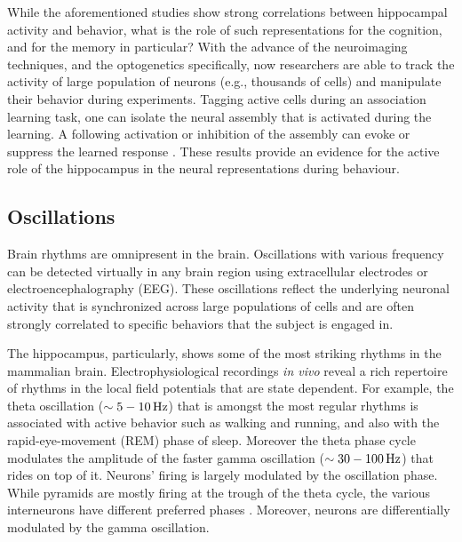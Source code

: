    While the aforementioned studies show strong correlations between
    hippocampal activity and behavior, what is the role of such representations
    for the cognition, and for the memory in particular? With the advance of
    the neuroimaging techniques, and the optogenetics specifically, now
    researchers are able to track the activity of large population of neurons
    (e.g., thousands of cells) and manipulate their behavior during
    experiments. Tagging active cells during an association learning task, one
    can isolate the neural assembly that is activated during the learning. A
    following activation or inhibition of the assembly can evoke or suppress
    the learned response \citep{Cowansage2014, Tanaka2014}. These results
    provide an evidence for the active role of the hippocampus in the neural
    representations during behaviour.

  \subsection{Oscillations}
    Brain rhythms are omnipresent in the brain. Oscillations with various
    frequency can be detected virtually in any brain region using extracellular
    electrodes or electroencephalography (EEG). These oscillations reflect the
    underlying neuronal activity that is synchronized across large populations
    of cells and are often strongly correlated to specific behaviors that the
    subject is engaged in.

    The hippocampus, particularly, shows some of the most striking rhythms in
    the mammalian brain. Electrophysiological recordings \textit{in vivo}
    reveal a rich repertoire of rhythms in the local field potentials that are
    state dependent. For example, the theta oscillation ($\sim 5-10 \rm\, Hz$)
    that is amongst the most regular rhythms is associated with active
    behavior such as walking and running, and also with the rapid-eye-movement
    (REM) phase of sleep. Moreover the theta phase cycle modulates the
    amplitude of the faster gamma oscillation ($\sim 30-100 \rm\, Hz$) that
    rides on top of it. Neurons' firing is largely modulated by the oscillation
    phase. While pyramids are mostly firing at the trough of the theta cycle,
    the various interneurons have different preferred phases
    \citep{Klausberger2008, Klausberger2009}. Moreover, neurons are differentially modulated by
    the gamma oscillation.

